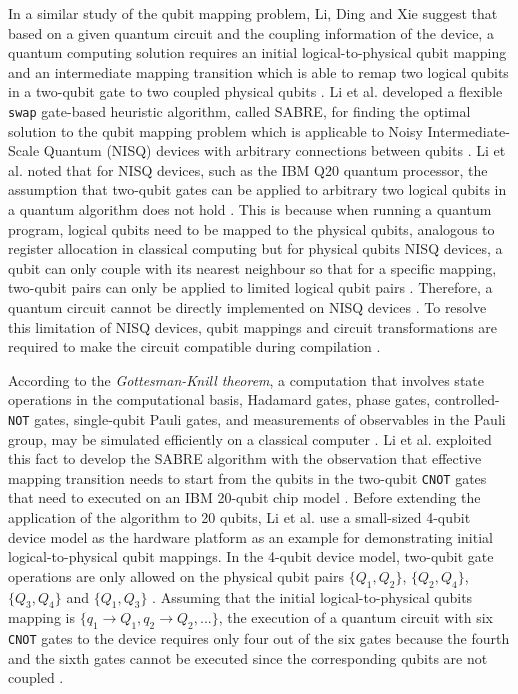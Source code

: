 In a similar study of the qubit mapping problem, Li, Ding and Xie suggest that based on a given quantum circuit and the coupling information of the device, a quantum computing solution requires an initial logical-to-physical qubit mapping and an intermediate mapping transition which is able to remap two logical qubits in a two-qubit gate to two coupled physical qubits \cite{li2019tackling}. Li et al. developed a flexible \texttt{swap} gate-based heuristic algorithm, called SABRE, for finding the optimal solution to the qubit mapping problem which is applicable to Noisy Intermediate-Scale Quantum (NISQ) devices with arbitrary connections between qubits \cite{li2019tackling}. Li et al. noted that for NISQ devices, such as the IBM Q20 quantum processor, the assumption that two-qubit gates can be applied to arbitrary two logical qubits in a quantum algorithm does not hold \cite{li2019tackling}. This is because when running a quantum program, logical qubits need to be mapped to the physical qubits, analogous to register allocation in classical computing but for physical qubits NISQ devices, a qubit can only couple with its nearest neighbour so that for a specific mapping, two-qubit pairs can only be applied to limited logical qubit pairs \cite{li2019tackling}. Therefore, a quantum circuit cannot be directly implemented on NISQ devices \cite{li2019tackling}. To resolve this limitation of NISQ devices, qubit mappings and circuit transformations are required to make the circuit compatible during compilation \cite{li2019tackling}. 
   
According to the \textit{Gottesman-Knill theorem}, a computation that involves state operations in the computational basis, Hadamard gates, phase gates, controlled-\texttt{NOT} gates, single-qubit Pauli gates, and measurements of observables in the Pauli group, may be simulated efficiently on a classical computer \cite{Nielsen2010}. Li et al. exploited this fact to develop the SABRE algorithm with the observation that effective mapping transition needs to start from the qubits in the two-qubit \texttt{CNOT} gates that need to executed on an IBM 20-qubit chip model \cite{li2019tackling}. Before extending the application of the algorithm to 20 qubits, Li et al. use a small-sized 4-qubit device model as the hardware platform as an example for demonstrating initial logical-to-physical qubit mappings. In the 4-qubit device model, two-qubit gate operations are only allowed on the physical qubit pairs $\{Q_1, Q_2\}$, $\{Q_2, Q_4\}$, $\{Q_3, Q_4\}$ and $\{Q_1, Q_3\}$ \cite{li2019tackling}. Assuming that the initial logical-to-physical qubits mapping is $\{q_1 \rightarrow Q_1, q_2 \rightarrow Q_2, ...\}$, the execution of a quantum circuit with six \texttt{CNOT} gates to the device requires only four out of the six gates because the fourth and the sixth gates cannot be executed since the corresponding qubits are not coupled \cite{li2019tackling}. 

